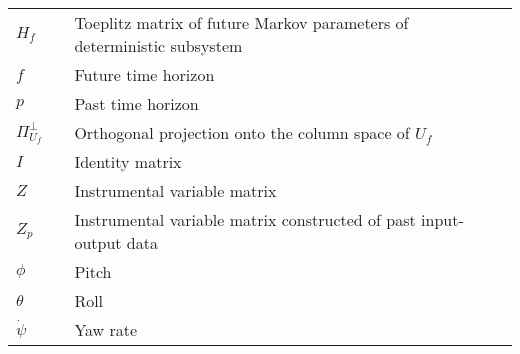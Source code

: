 {\begin{longtable}{lll}
$H_f$				&& Toeplitz matrix of future Markov parameters of deterministic subsystem\\
$f$					&& Future time horizon\\
$p$					&& Past time horizon\\
$\Pi_{U_f}^\perp$ 	&& Orthogonal projection onto the column space of $U_f$\\
$I$					&& Identity matrix\\
$Z$					&& Instrumental variable matrix\\
$Z_p$				&& Instrumental variable matrix constructed of past input-output data\\
$\phi$				&& Pitch\\
$\theta$			&& Roll\\
$\dot\psi$				&& Yaw rate\\
\end{longtable}

}